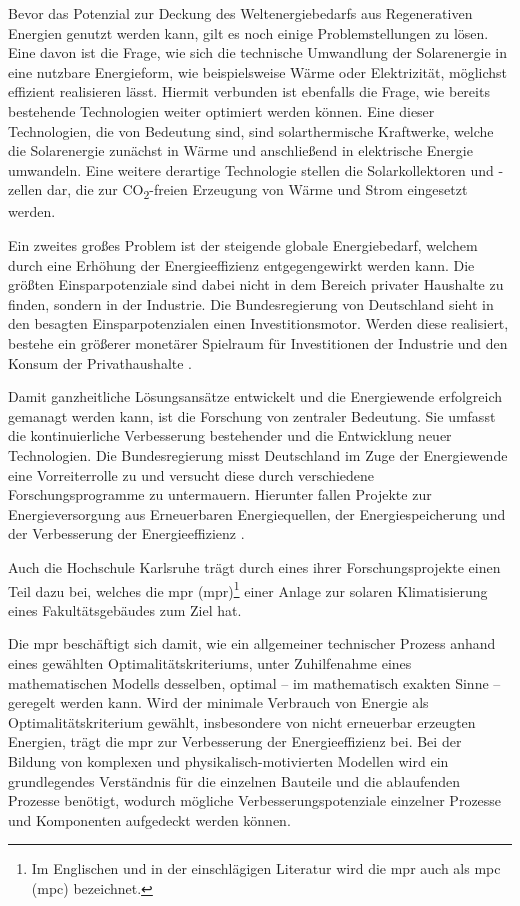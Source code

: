 Bevor das Potenzial zur Deckung des Weltenergiebedarfs aus Regenerativen Energien genutzt werden kann, gilt es noch einige Problemstellungen zu lösen.
Eine davon ist die Frage, wie sich die technische Umwandlung der Solarenergie in eine nutzbare Energieform, wie beispielsweise Wärme oder Elektrizität, möglichst effizient realisieren lässt. Hiermit verbunden ist ebenfalls die Frage, wie bereits bestehende Technologien weiter optimiert werden können. Eine dieser Technologien, die von Bedeutung sind, sind solarthermische Kraftwerke, welche die Solarenergie zunächst in Wärme und anschließend in elektrische Energie umwandeln. Eine weitere derartige Technologie stellen die Solarkollektoren und -zellen dar, die zur CO\textsubscript{2}-freien Erzeugung von Wärme und Strom eingesetzt werden\cite[S.~36f.]{qu11}.

Ein zweites großes Problem ist der steigende globale Energiebedarf, welchem durch eine Erhöhung der Energieeffizienz entgegengewirkt werden kann. Die größten Einsparpotenziale sind dabei nicht in dem Bereich privater Haushalte zu finden, sondern in der Industrie. Die Bundesregierung von Deutschland sieht in den besagten Einsparpotenzialen einen Investitionsmotor. Werden diese realisiert, bestehe ein größerer monetärer Spielraum für Investitionen der Industrie und den Konsum der Privathaushalte \cite[S.~2]{bi15}.

Damit ganzheitliche Lösungsansätze entwickelt und die Energiewende erfolgreich gemanagt werden kann, ist die Forschung von zentraler Bedeutung. Sie umfasst die kontinuierliche Verbesserung bestehender und die Entwicklung neuer Technologien. Die Bundesregierung misst Deutschland im Zuge der Energiewende eine Vorreiterrolle zu und versucht diese durch verschiedene Forschungsprogramme zu untermauern. Hierunter fallen Projekte zur Energieversorgung aus Erneuerbaren Energiequellen, der Energiespeicherung und der Verbesserung der Energieeffizienz \cite[S.~11]{bi15}.
 
Auch die Hochschule Karlsruhe trägt durch eines ihrer Forschungsprojekte einen Teil dazu bei, welches die \acrlong{mpr} (\acrshort{mpr})\footnote{Im Englischen und in der einschlägigen Literatur wird die \acrlong{mpr} auch als \acrlong{mpc} (\acrshort{mpc}) bezeichnet.} einer Anlage zur solaren Klimatisierung eines Fakultätsgebäudes zum Ziel hat.

Die \acrlong{mpr} beschäftigt sich damit, wie ein allgemeiner technischer Prozess anhand eines gewählten Optimalitätskriteriums, unter Zuhilfenahme eines mathematischen Modells desselben, optimal -- im mathematisch exakten Sinne -- geregelt werden kann. Wird der minimale Verbrauch von Energie als Optimalitätskriterium gewählt, insbesondere von nicht erneuerbar erzeugten Energien, trägt die \acrshort{mpr} zur Verbesserung der Energieeffizienz bei.
Bei der Bildung von komplexen und physikalisch-motivierten Modellen wird ein grundlegendes Verständnis für die einzelnen Bauteile und die ablaufenden Prozesse benötigt, wodurch mögliche Verbesserungspotenziale einzelner Prozesse und Komponenten aufgedeckt werden können.

